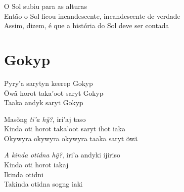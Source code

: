 \smallskip
\begin{center}\end{center}
\smallskip

\noindent O Sol subiu para as alturas\\
Então o Sol ficou incandescente, incandescente de verdade\\
Assim, dizem, é que a história do Sol deve ser contada

\chapter{Gokyp}

\noindent Pyry'a sarytyn keerep Gokyp\\
Õwã horot taka'oot saryt Gokyp\\
Taaka andyk saryt Gokyp

\smallskip
\begin{center}\end{center}
\smallskip

\noindent Masõng \textit{ti'a hỹ?}, iri'aj taso\\
Kinda oti horot taka'oot saryt ihot iaka\\
Okywyra okywyra okywyra taaka saryt õwã

\smallskip
\begin{center}\end{center}
\smallskip

\noindent \textit{A kinda otidna hỹ?}, iri'a andyki ijiriso\\
Kinda oti horot iakaj\\
Ikinda otidni\\
Takinda otidna sogng iaki

